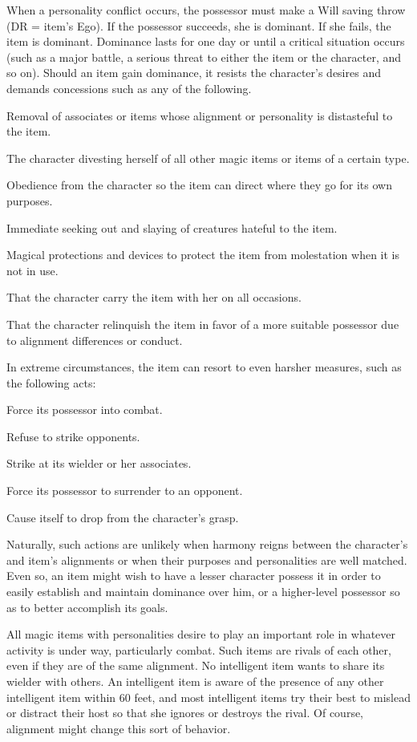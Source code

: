 When a personality conflict occurs, the possessor must make a Will saving throw (DR = item's Ego). If the possessor succeeds, she is dominant. If she fails, the item is dominant. Dominance lasts for one day or until a critical situation occurs (such as a major battle, a serious threat to either the item or the character, and so on). Should an item gain dominance, it resists the character's desires and demands concessions such as any of the following.
\item Removal of associates or items whose alignment or personality is distasteful to the item.
\item The character divesting herself of all other magic items or items of a certain type.
\item Obedience from the character so the item can direct where they go for its own purposes.
\item Immediate seeking out and slaying of creatures hateful to the item.
\item Magical protections and devices to protect the item from molestation when it is not in use.
\item That the character carry the item with her on all occasions.
\item That the character relinquish the item in favor of a more suitable possessor due to alignment differences or conduct.

In extreme circumstances, the item can resort to even harsher measures, such as the following acts:
\item Force its possessor into combat.
\item Refuse to strike opponents.
\item Strike at its wielder or her associates.
\item Force its possessor to surrender to an opponent.
\item Cause itself to drop from the character's grasp.



Naturally, such actions are unlikely when harmony reigns between the character's and item's alignments or when their purposes and personalities are well matched. Even so, an item might wish to have a lesser character possess it in order to easily establish and maintain dominance over him, or a higher-level possessor so as to better accomplish its goals.

All magic items with personalities desire to play an important role in whatever activity is under way, particularly combat. Such items are rivals of each other, even if they are of the same alignment. No intelligent item wants to share its wielder with others. An intelligent item is aware of the presence of any other intelligent item within 60 feet, and most intelligent items try their best to mislead or distract their host so that she ignores or destroys the rival. Of course, alignment might change this sort of behavior. 

